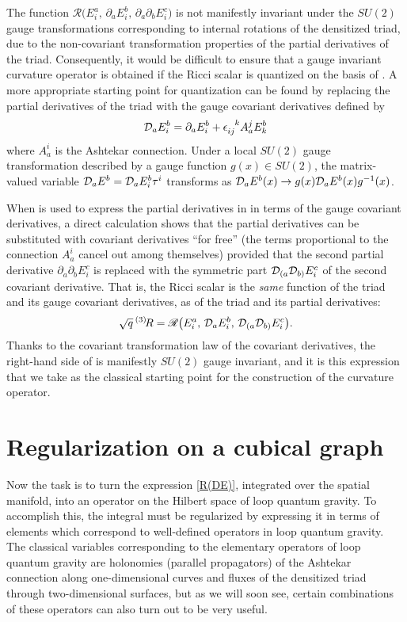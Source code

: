 \documentclass{appolb_edited}
\newcommand{\downup}[2]{_{#1}^{\phantom{#1}#2}}
\newcommand{\D}{{\cal D}}
\newcommand{\R}{{\mathscr R}}
\newcommand{\Rt}{\,{}^{(3)}\!R}
\begin{document}
The function $\R\bigl(E^a_i, \, \partial_aE^b_i, \, \partial_a\partial_bE^c_i\bigr)$ is not manifestly invariant under the $SU(2)$ gauge transformations corresponding to internal rotations of the densitized triad, due to the non-covariant transformation properties of the partial derivatives of the triad. Consequently, it would be difficult to ensure that a gauge invariant curvature operator is obtained if the Ricci scalar is quantized on the basis of . A more appropriate starting point for quantization can be found by replacing the partial derivatives of the triad with the gauge covariant derivatives defined by 
\begin{equation}
	\D_aE^b_i = \partial_aE^b_i + \epsilon\downup{ij}{k}A_a^jE^b_k
	\label{DE}
\end{equation}
where $A_a^i$ is the Ashtekar connection. Under a local $SU(2)$ gauge transformation described by a gauge function $g(x)\in SU(2)$, the matrix-valued variable $\D_aE^b = \D_aE^b_i\tau^i$ transforms as $\D_aE^b(x) \to g(x)\D_aE^b(x)g^{-1}(x)$.

When  is used to express the partial derivatives in  in terms of the gauge covariant derivatives, a direct calculation shows that the partial derivatives can be substituted with covariant derivatives ``for free'' (the terms proportional to the connection $A_a^i$ cancel out among themselves) provided that the second partial derivative $\partial_a\partial_bE^c_i$ is replaced with the symmetric part $\D_{(a}\D_{b)}E^c_i$ of the second covariant derivative. That is, the Ricci scalar is the {\em same} function of the triad and its gauge covariant derivatives, as of the triad and its partial derivatives:
\begin{equation}
	\sqrt q\Rt = \R\bigl(E^a_i, \, \D_aE^b_i, \, \D_{(a}\D_{b)}E^c_i\bigr).
	\label{R(DE)}
\end{equation}
Thanks to the covariant transformation law of the covariant derivatives, the right-hand side of  is manifestly $SU(2)$ gauge invariant, and it is this expression that we take as the classical starting point for the construction of the curvature operator.

\section{Regularization on a cubical graph}
\label{regularization}

Now the task is to turn the expression \eqref{R(DE)}, integrated over the spatial manifold, into an operator on the Hilbert space of loop quantum gravity. To accomplish this, the integral must be regularized by expressing it in terms of elements which correspond to well-defined operators in loop quantum gravity. The classical variables corresponding to the elementary operators of loop quantum gravity are holonomies (parallel propagators) of the Ashtekar connection along one-dimensional curves and fluxes of the densitized triad through two-dimensional surfaces, but as we will soon see, certain combinations of these operators can also turn out to be very useful.
\end{document}
